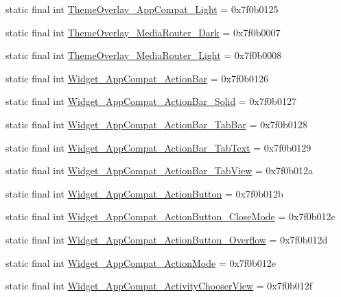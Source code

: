 \begin{CompactItemize}
\item 
static final int \hyperlink{classandroid_1_1support_1_1v4_1_1_r_1_1style_78a7b390be8f5ee5cbbd6b20eea8a424}{ThemeOverlay\_\-AppCompat\_\-Light} = 0x7f0b0125
\item 
static final int \hyperlink{classandroid_1_1support_1_1v4_1_1_r_1_1style_db4def38a140ada83acfa8859101ed3b}{ThemeOverlay\_\-MediaRouter\_\-Dark} = 0x7f0b0007
\item 
static final int \hyperlink{classandroid_1_1support_1_1v4_1_1_r_1_1style_0b034d7e64feec15a879277c870e0421}{ThemeOverlay\_\-MediaRouter\_\-Light} = 0x7f0b0008
\item 
static final int \hyperlink{classandroid_1_1support_1_1v4_1_1_r_1_1style_6dc5b7b2f063568a265d254cd9332803}{Widget\_\-AppCompat\_\-ActionBar} = 0x7f0b0126
\item 
static final int \hyperlink{classandroid_1_1support_1_1v4_1_1_r_1_1style_192d86c1f2fbf8b4b3473ecf68e651ec}{Widget\_\-AppCompat\_\-ActionBar\_\-Solid} = 0x7f0b0127
\item 
static final int \hyperlink{classandroid_1_1support_1_1v4_1_1_r_1_1style_e1de586b891ae665f51822039d09c2d7}{Widget\_\-AppCompat\_\-ActionBar\_\-TabBar} = 0x7f0b0128
\item 
static final int \hyperlink{classandroid_1_1support_1_1v4_1_1_r_1_1style_cf30a3082f4075d44bcedddce31d2738}{Widget\_\-AppCompat\_\-ActionBar\_\-TabText} = 0x7f0b0129
\item 
static final int \hyperlink{classandroid_1_1support_1_1v4_1_1_r_1_1style_dfd2896c0b29005e0e8c245b3ff208d3}{Widget\_\-AppCompat\_\-ActionBar\_\-TabView} = 0x7f0b012a
\item 
static final int \hyperlink{classandroid_1_1support_1_1v4_1_1_r_1_1style_28b9cd8abdab0b4c6539f2e3cbe72d05}{Widget\_\-AppCompat\_\-ActionButton} = 0x7f0b012b
\item 
static final int \hyperlink{classandroid_1_1support_1_1v4_1_1_r_1_1style_821ddaf6e72391aadb1e10be770926a0}{Widget\_\-AppCompat\_\-ActionButton\_\-CloseMode} = 0x7f0b012c
\item 
static final int \hyperlink{classandroid_1_1support_1_1v4_1_1_r_1_1style_da2b0bae943a5ad7aed456200189bc94}{Widget\_\-AppCompat\_\-ActionButton\_\-Overflow} = 0x7f0b012d
\item 
static final int \hyperlink{classandroid_1_1support_1_1v4_1_1_r_1_1style_24ddedea5794c7ffae36638d2284faea}{Widget\_\-AppCompat\_\-ActionMode} = 0x7f0b012e
\item 
static final int \hyperlink{classandroid_1_1support_1_1v4_1_1_r_1_1style_018ac84e344924100ea8748b4482606b}{Widget\_\-AppCompat\_\-ActivityChooserView} = 0x7f0b012f

\end{CompactItemize}
